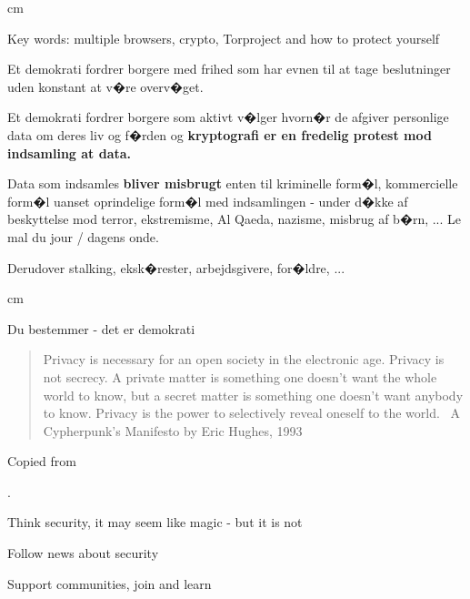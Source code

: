 \documentclass[20pt,landscape,a4paper,footrule]{foils}
\begin{document}
 cm

Key words: multiple browsers, crypto, Torproject and how to protect yourself




Et demokrati fordrer borgere med frihed som har evnen til at tage beslutninger uden konstant at v�re overv�get.

Et demokrati fordrer borgere som aktivt v�lger hvorn�r de afgiver personlige data om deres liv og f�rden og
{\bf kryptografi er en fredelig protest mod indsamling at data.}



Data som indsamles {\bf bliver misbrugt} enten til kriminelle form�l, kommercielle form�l uanset oprindelige form�l med indsamlingen - under d�kke af beskyttelse mod terror, ekstremisme, Al Qaeda, nazisme, misbrug af b�rn, ... Le mal du jour / dagens onde.

Derudover stalking, eksk�rester, arbejdsgivere, for�ldre, ...

 cm
\centerline{\Large Du bestemmer - det er demokrati}






\begin{quote}
	Privacy is necessary for an open society in the electronic age. Privacy is not secrecy. A private matter is something one doesn't want the whole world to know, but a secret matter is something one doesn't want anybody to know. Privacy is the power to selectively reveal oneself to the world. ~A Cypherpunk's Manifesto by Eric Hughes, 1993
\end{quote}

Copied from 





.

\begin{list1}
\item Think security, it may seem like magic - but it is not
\item Follow news about security
\item Support communities, join and learn
\end{list1}
\end{document}
